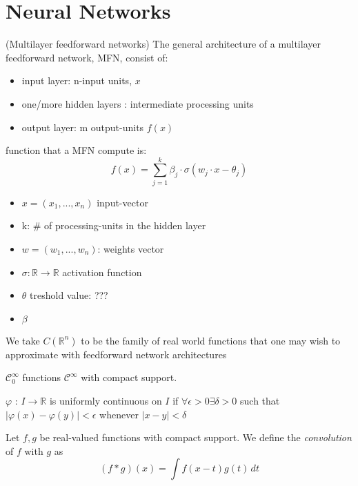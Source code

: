 \documentclass[../main.tex]{subfiles}
\begin{document}
\section{Neural Networks}
\begin{definition} (Multilayer feedforward networks) 
The general architecture of a multilayer feedforward network, MFN, consist of: 
\begin{itemize}
	\item input layer: n-input units, $x$
	\item one/more hidden layers : intermediate processing units 
	\item output layer: m output-units	 $f(x)$
\end{itemize} 

	
	function that a MFN compute is: 
	$$f(x)=\sum_{j=1}^k \beta_j \cdot \sigma(w_j \cdot x - \theta_j)$$
	
	\begin{itemize}
		\item $x = (x_1,...,x_n)$ input-vector
		\item k: $\#$ of processing-units in the hidden layer
		\item $w=(w_1,...,w_n)$:  weights vector
		\item $\sigma : \mathbb{R} \rightarrow \mathbb{R}$ activation function
		\item $\theta$ treshold value: ??? 
		\item $\beta$ 
	\end{itemize}
	
\end{definition}


We take $C(\mathbb{R}^n)$ to be the family of real world functions that one may wish to approximate with feedforward network architectures \\ 

	\begin{definition} 
	$ \mathcal{C}^\infty_0$ functions $\mathcal{C}^\infty$ with compact support.  
\end{definition}

\begin{definition} 
	$\varphi$ : $I \rightarrow \mathbb{R}$ is uniformly continuous on $I$ if $\forall \epsilon > 0 \exists \delta >0 $ such that $|\varphi(x)- \varphi(y)| < \epsilon$ whenever $|x-y|< \delta$
\end{definition}

\begin{definition}
	Let $f,g$ be real-valued functions with compact support. We define the \emph{convolution} of $f$ with $g$ as $$(f\ast g)(x)=\int f(x-t)g(t) \, dt$$
\end{definition}
\end{document}
